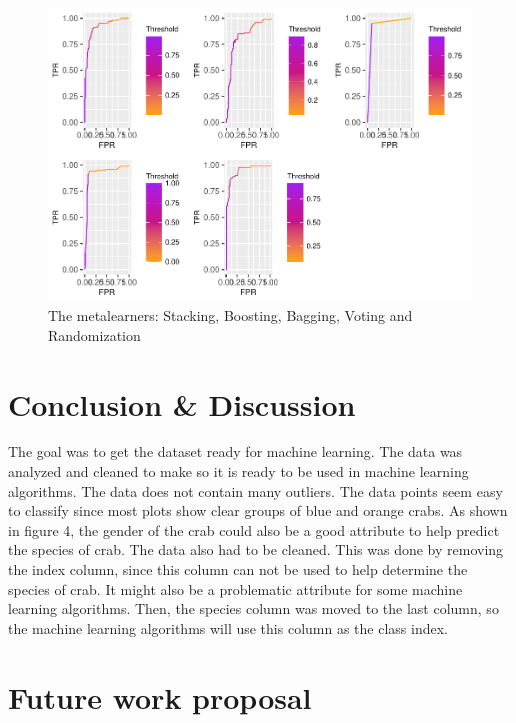 \documentclass[
]{article}
\begin{document}
\begin{figure}[H]

{\centering \includegraphics{CrabProject_files/figure-latex/unnamed-chunk-3-1} 

}

\caption{The metalearners: Stacking, Boosting, Bagging, Voting and Randomization}\label{fig:unnamed-chunk-3}
\end{figure}

\newpage

\hypertarget{conclusion-discussion}{%
\section{Conclusion \& Discussion}\label{conclusion-discussion}}

The goal was to get the dataset ready for machine learning. The data was
analyzed and cleaned to make so it is ready to be used in machine
learning algorithms. The data does not contain many outliers. The data
points seem easy to classify since most plots show clear groups of blue
and orange crabs. As shown in figure 4, the gender of the crab could
also be a good attribute to help predict the species of crab. The data
also had to be cleaned. This was done by removing the index column,
since this column can not be used to help determine the species of crab.
It might also be a problematic attribute for some machine learning
algorithms. Then, the species column was moved to the last column, so
the machine learning algorithms will use this column as the class index.

\hypertarget{future-work-proposal}{%
\section{Future work proposal}\label{future-work-proposal}}
\end{document}

